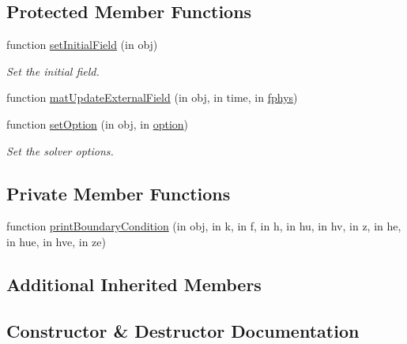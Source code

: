 \subsection*{Protected Member Functions}
\begin{DoxyCompactItemize}
\item 
function \hyperlink{class_s_w_e_boundary_condition_unit_test2d_a6c9ce48ab16929033752f21f1f4d30c1}{set\+Initial\+Field} (in obj)
\begin{DoxyCompactList}\small\item\em Set the initial field. \end{DoxyCompactList}\item 
function \hyperlink{class_s_w_e_boundary_condition_unit_test2d_a97645cabad4fca714d256c65c63128d7}{mat\+Update\+External\+Field} (in obj, in time, in \hyperlink{class_ndg_phys_a6b25724fc9474d32018439009072f0a9}{fphys})
\item 
function \hyperlink{class_s_w_e_boundary_condition_unit_test2d_a4cf084dc0b798f68c9f216aa5ac6f940}{set\+Option} (in obj, in \hyperlink{class_ndg_phys_af91f4c54b93504e76b38a5693774dff1}{option})
\begin{DoxyCompactList}\small\item\em Set the solver options. \end{DoxyCompactList}\end{DoxyCompactItemize}
\subsection*{Private Member Functions}
\begin{DoxyCompactItemize}
\item 
function \hyperlink{class_s_w_e_boundary_condition_unit_test2d_aa41e79e42e50d8dce56ab589409cd72f}{print\+Boundary\+Condition} (in obj, in k, in f, in h, in hu, in hv, in z, in he, in hue, in hve, in ze)
\end{DoxyCompactItemize}
\subsection*{Additional Inherited Members}


\subsection{Constructor \& Destructor Documentation}
\mbox{\label{class_s_w_e_boundary_condition_unit_test2d_a08448218e450dd02837eb84f008f0923}} 
